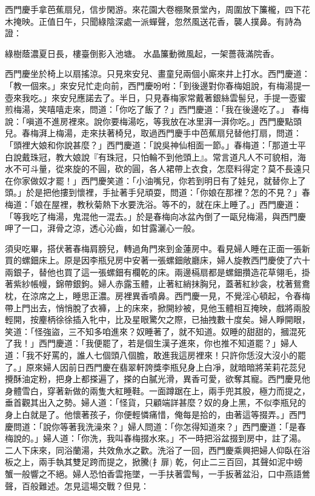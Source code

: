 \begin{showcontents}{}
西門慶手拿芭蕉扇兒，信步閑游。來花園大卷棚聚景堂內，周圍放下簾櫳，四下花木掩映。正值日午，只聞綠陰深處一派蟬聲，忽然風送花香，襲人撲鼻。有詩為證：

綠樹蔭濃夏日長，樓臺倒影入池塘。
水晶簾動微風起，一架薔薇滿院香。

西門慶坐於椅上以扇搖涼。只見來安兒、畫童兒兩個小廝來井上打水。西門慶道：「教一個來。」來安兒忙走向前，西門慶吩咐：「到後邊對你春梅姐說，有梅湯提一壺來我吃。」來安兒應諾去了。半日，只見春梅家常戴著銀絲雲髻兒，手提一壺蜜煎梅湯，笑嘻嘻走來，問道：「你吃了飯了？」西門慶道：「我在後邊吃了。」 春梅說：「嗔道不進房裡來。說你要梅湯吃，等我放在冰里湃一湃你吃。」西門慶點頭兒。春梅湃上梅湯，走來扶著椅兒，取過西門慶手中芭蕉扇兒替他打扇，問道：「頭裡大娘和你說甚麼？」西門慶道：「說吳神仙相面一節。」春梅道：「那道士平白說戴珠冠，教大娘說『有珠冠，只怕輪不到他頭上』。常言道凡人不可貌相，海水不可斗量，從來旋的不圓，砍的圓，各人裙帶上衣食，怎麼料得定？莫不長遠只在你家做奴才罷！」西門慶笑道：「小油嘴兒，你若到明日有了娃兒，就替你上了頭。」於是把他摟到懷裡，手扯著手兒頑耍，問道：「你娘在那裡？怎的不見？」春梅道：「娘在屋裡，教秋菊熱下水要洗浴。等不的，就在床上睡了。」西門慶道：「等我吃了梅湯，鬼混他一混去。」於是春梅向冰盆內倒了一甌兒梅湯，與西門慶呷了一口，湃骨之涼，透心沁齒，如甘露灑心一般。

須臾吃畢，搭伏著春梅肩膀兒，轉過角門來到金蓮房中。看見婦人睡在正面一張新買的螺鈿床上。原是因李瓶兒房中安著一張螺鈿敞廳床，婦人旋教西門慶使了六十兩銀子，替他也買了這一張螺鈿有欄乾的床。兩邊槅扇都是螺鈿攢造花草翎毛，掛著紫紗帳幔，錦帶銀鉤。婦人赤露玉體，止著紅綃抹胸兒，蓋著紅紗衾，枕著鴛鴦枕，在涼席之上，睡思正濃。房裡異香噴鼻。西門慶一見，不覺淫心頓起，令春梅帶上門出去，悄悄脫了衣褲，上的床來，掀開紗被，見他玉體相互掩映，戲將兩股輕開，按麈柄徐徐插入牝中，比及星眼驚欠之際，已抽拽數十度矣。婦人睜開眼，笑道：「怪強盜，三不知多咱進來？奴睡著了，就不知道。奴睡的甜甜的，摑混死了我！」西門慶道：「我便罷了，若是個生漢子進來，你也推不知道罷？」婦人道：「我不好罵的，誰人七個頭八個膽，敢進我這房裡來！只許你恁沒大沒小的罷了。」原來婦人因前日西門慶在翡翠軒誇獎李瓶兒身上白凈，就暗暗將茉莉花蕊兒攪酥油定粉，把身上都搽遍了，搽的白膩光滑，異香可愛，欲奪其寵。西門慶見他身體雪白，穿著新做的兩隻大紅睡鞋。一面蹲踞在上，兩手兜其股，極力而提之，垂首觀其出入之勢。婦人道：「怪貨，只顧端詳甚麼？奴的身上黑，不似李瓶兒的身上白就是了。他懷著孩子，你便輕憐痛惜，俺每是拾的，由著這等掇弄。」西門慶問道：「說你等著我洗澡來？」婦人問道：「你怎得知道來？」西門慶道：「是春梅說的。」婦人道：「你洗，我叫春梅掇水來。」不一時把浴盆掇到房中，註了湯。二人下床來，同浴蘭湯，共效魚水之歡。洗浴了一回，西門慶乘興把婦人仰臥在浴板之上，兩手執其雙足跨而提之，掀騰(扌扉) 乾，何止二三百回，其聲如泥中螃蟹一般響之不絕。婦人恐怕香雲拖墜，一手扶著雲髩，一手扳著盆沿，口中燕語鶯聲，百般難述。怎見這場交戰？但見：


\end{showcontents}
